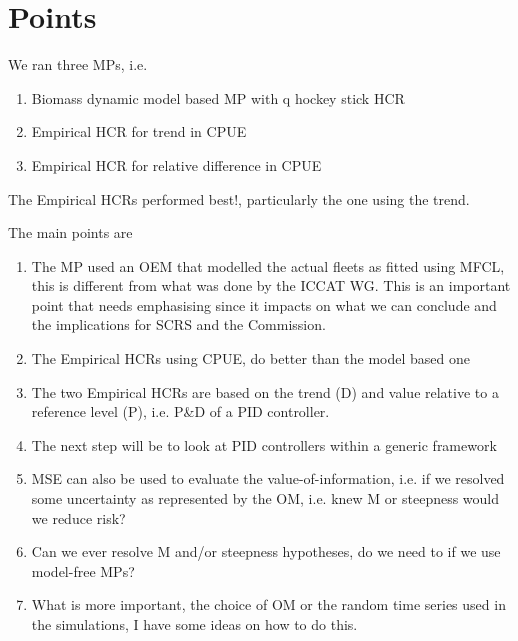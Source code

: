 \documentclass[%
nonumbib,      %
%
]{nrc1}                          %
\begin{document}
\newpage

\section*{Points}


We ran three MPs, i.e.

\begin{enumerate}
\item Biomass dynamic model based MP with q hockey stick HCR
\item Empirical HCR for trend in CPUE
\item Empirical HCR for relative difference in CPUE
\end{enumerate}
    

The Empirical HCRs performed best!, particularly the one using the trend.

The main points are

\begin{enumerate}
\item The MP used an OEM that modelled the actual fleets as fitted using MFCL, this is different from what was done by the ICCAT WG. This is an important point that needs emphasising since it impacts on what we can conclude and the implications for SCRS and the Commission.
\item The Empirical HCRs using CPUE, do better than the model based one
\item The two Empirical HCRs are based on the trend (D) and value relative to a reference level (P), i.e. P\&D of a PID controller. \item The next step will be to look at PID controllers within a generic framework
\item MSE can also be used to evaluate the value-of-information, i.e. if we resolved some uncertainty as represented by the OM, i.e. knew M or steepness would we reduce risk?
\item Can we ever resolve M and/or steepness hypotheses, do we need to if we use model-free MPs?
\item What is more important, the choice of OM or the random time series used in the simulations, I have some ideas on how to do this.
\end{enumerate}


\end{document}
